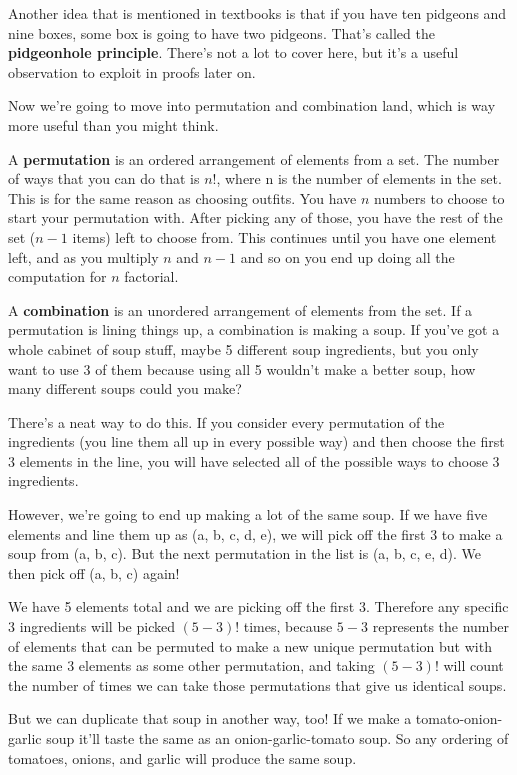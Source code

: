 \documentclass{article}
\begin{document}
    Another idea that is mentioned in textbooks is that if you have ten pidgeons and nine boxes, some box is going to have two pidgeons.
    That's called the \textbf{pidgeonhole principle}.
    There's not a lot to cover here, but it's a useful observation to exploit in proofs later on.

    Now we're going to move into permutation and combination land, which is way more useful than you might think.

    A \textbf{permutation} is an ordered arrangement of elements from a set.
    The number of ways that you can do that is $n!$, where n is the number of elements in the set.
    This is for the same reason as choosing outfits.
    You have $n$ numbers to choose to start your permutation with.
    After picking any of those, you have the rest of the set ($n-1$ items) left to choose from.
    This continues until you have one element left, and as you multiply $n$ and $n-1$ and so on you end up doing all the computation for $n$ factorial.

    A \textbf{combination} is an unordered arrangement of elements from the set.
    If a permutation is lining things up, a combination is making a soup.
    If you've got a whole cabinet of soup stuff, maybe 5 different soup ingredients, but you only want to use 3 of them because using all 5 wouldn't make a better soup, how many different soups could you make?

    There's a neat way to do this.
    If you consider every permutation of the ingredients (you line them all up in every possible way)
    and then choose the first 3 elements in the line, you will have selected all of the possible ways to choose 3 ingredients.

    However, we're going to end up making a lot of the same soup.
    If we have five elements and line them up as (a, b, c, d, e), we will pick off the first 3 to make a soup from (a, b, c).
    But the next permutation in the list is (a, b, c, e, d). We then pick off (a, b, c) again!
    
    We have 5 elements total and we are picking off the first 3.
    Therefore any specific 3 ingredients will be picked $(5-3)!$ times, because $5-3$ represents the number of elements that can be permuted to make a new unique permutation but with the same 3 elements as some other permutation,
    and taking $(5-3)!$ will count the number of times we can take those permutations that give us identical soups.

    But we can duplicate that soup in another way, too!
    If we make a tomato-onion-garlic soup it'll taste the same as an onion-garlic-tomato soup.
    So any ordering of tomatoes, onions, and garlic will produce the same soup.
\end{document}

